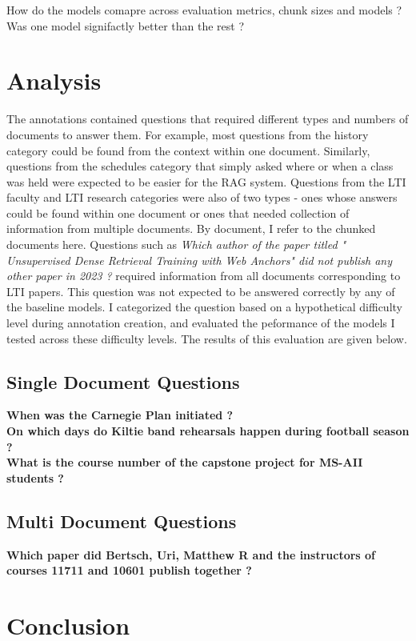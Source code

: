 \documentclass[11pt]{article}
\begin{document}
How do the models comapre across evaluation metrics, chunk sizes and models ?
Was one model signifactly better than the rest ?

\section{Analysis}
The annotations contained questions that required different types and numbers of documents to answer them. For example, most questions from the history category could be found from the context within one document. Similarly, questions from the schedules category that simply asked where or when a class was held were expected to be easier for the RAG system.
Questions from the LTI faculty and LTI research categories were also of two types - ones whose answers could be found within one document or ones that needed collection of information from multiple documents. By document, I refer to the chunked documents here.
Questions such as \textit{Which author of the paper titled " Unsupervised Dense Retrieval Training with Web Anchors" did not publish any other paper in 2023 ?} required information from all documents corresponding to LTI papers. This question was not expected to be answered correctly by any of the baseline models.
I categorized the question based on a hypothetical difficulty level during annotation creation, and evaluated the peformance of the models I tested across these difficulty levels. The results of this evaluation are given below.
\subsection{Single Document Questions}
\textbf{When was the Carnegie Plan initiated ?}
\mdseries{}
\\
\textbf{On which days do Kiltie band rehearsals happen during football season ?}
\mdseries{}\\
\textbf{What is the course number of the capstone project for MS-AII students ?}
\mdseries{}

\subsection{Multi Document Questions}

\textbf{Which paper did Bertsch, Uri, Matthew R and the instructors of courses 11711 and 10601 publish together ?}
\mdseries{}

\section{Conclusion}
\end{document}

